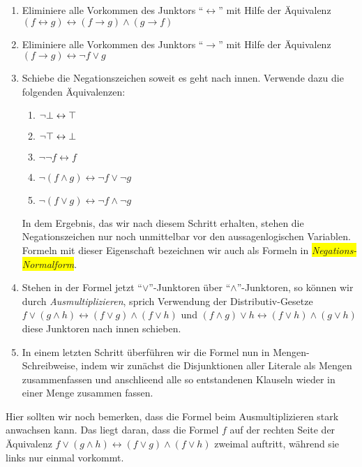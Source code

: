 \begin{enumerate}
\item Eliminiere alle Vorkommen des Junktors ``$\leftrightarrow$'' mit Hilfe der \"{A}quivalenz \\[0.2cm]
      \hspace*{1.3cm} 
      $(f \leftrightarrow g) \leftrightarrow (f \rightarrow g) \wedge (g \rightarrow f)$
\item Eliminiere alle Vorkommen des Junktors ``$\rightarrow$'' mit Hilfe der \"{A}quivalenz \\[0.2cm]
      \hspace*{1.3cm} 
      $(f \rightarrow g) \leftrightarrow \neg f \vee g$
\item Schiebe die Negationszeichen soweit es geht nach innen.  Verwende dazu die folgenden \"{A}quivalenzen:
      \begin{enumerate}
      \item $\neg \bot \leftrightarrow \top$
      \item $\neg \top \leftrightarrow \bot$
      \item $\neg \neg f \leftrightarrow f$
      \item $\neg (f \wedge g) \leftrightarrow  \neg f \vee   \neg g$ 
      \item $\neg (f \vee   g) \leftrightarrow  \neg f \wedge \neg g$ 
      \end{enumerate}
      In dem Ergebnis, das wir nach diesem Schritt erhalten, stehen die Negationszeichen
      nur noch unmittelbar vor den aussagenlogischen Variablen.  Formeln mit dieser
      Eigenschaft bezeichnen wir auch als Formeln in \colorbox{yellow}{\emph{Negations-Normalform}}.
\item Stehen in der Formel jetzt ``$\vee$''-Junktoren \"{u}ber ``$\wedge$''-Junktoren, so k\"{o}nnen wir durch
      \emph{Ausmultiplizieren}, sprich Verwendung der Distributiv-Gesetze \\[0.2cm]
      \hspace*{1.3cm} 
      $f \vee (g \wedge h) \leftrightarrow (f \vee g) \wedge (f \vee h)$ \quad und \quad
      $(f \wedge g) \vee h \leftrightarrow (f \vee h) \wedge (g \vee h)$ 
      \\[0.2cm]
      diese Junktoren nach innen schieben.
\item In einem letzten Schritt \"{u}berf\"{u}hren wir die Formel nun in Mengen-Schreibweise, indem
      wir zun\"{a}chst die Disjunktionen aller Literale als Mengen zusammenfassen und anschlie\3end
      alle so entstandenen Klauseln wieder in einer Menge zusammen fassen.
\end{enumerate}
Hier sollten wir noch bemerken, dass die Formel beim Ausmultiplizieren stark anwachsen kann.
Das liegt daran, dass die Formel $f$ auf der rechten Seite der \"{A}quivalenz 
$f \vee (g \wedge h) \leftrightarrow (f \vee g) \wedge (f \vee h)$ zweimal auftritt, w\"{a}hrend sie
links nur einmal      vorkommt. 

